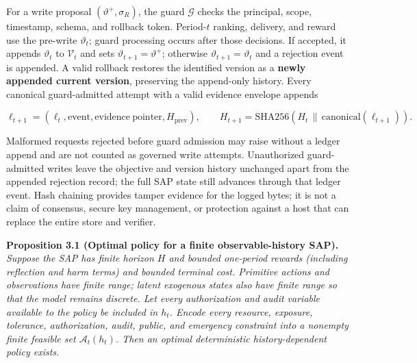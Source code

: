 \documentclass[
  11pt]{article}
\begin{document}
For a write proposal \((\vartheta^+,\sigma_R)\), the guard
\(\mathcal G\) checks the principal, scope, timestamp, schema, and
rollback token. Period-\(t\) ranking, delivery, and reward use the
pre-write \(\vartheta_t\); guard processing occurs after those
decisions. If accepted, it appends \(\vartheta_t\) to \(\mathcal V_t\)
and sets \(\vartheta_{t+1}=\vartheta^+\); otherwise
\(\vartheta_{t+1}=\vartheta_t\) and a rejection event is appended. A
valid rollback restores the identified version as a \textbf{newly
appended current version}, preserving the append-only history. Every
canonical guard-admitted attempt with a valid evidence envelope appends

\[\ell_{t+1}=(\ell_t,\mathrm{event},\mathrm{evidence\ pointer},H_{\mathrm{prev}}),\qquad
H_{t+1}=\mathrm{SHA256}(H_t\,\|\,\mathrm{canonical}(\ell_{t+1})).\tag{3}\]

Malformed requests rejected before guard admission may raise without a
ledger append and are not counted as governed write attempts.
Unauthorized guard-admitted writes leave the objective and version
history unchanged apart from the appended rejection record; the full SAP
state still advances through that ledger event. Hash chaining provides
tamper evidence for the logged bytes; it is not a claim of consensus,
secure key management, or protection against a host that can replace the
entire store and verifier.

\textbf{Proposition 3.1 (Optimal policy for a finite observable-history
SAP).} \emph{Suppose the SAP has finite horizon \(H\) and bounded
one-period rewards (including reflection and harm terms) and bounded
terminal cost. Primitive actions and observations have finite range;
latent exogenous states also have finite range so that the model remains
discrete. Let every authorization and audit variable available to the
policy be included in \(h_t\). Encode every resource, exposure,
tolerance, authorization, audit, public, and emergency constraint into a
nonempty finite feasible set \(\mathcal A_t(h_t)\). Then an optimal
deterministic history-dependent policy exists.}
\end{document}
